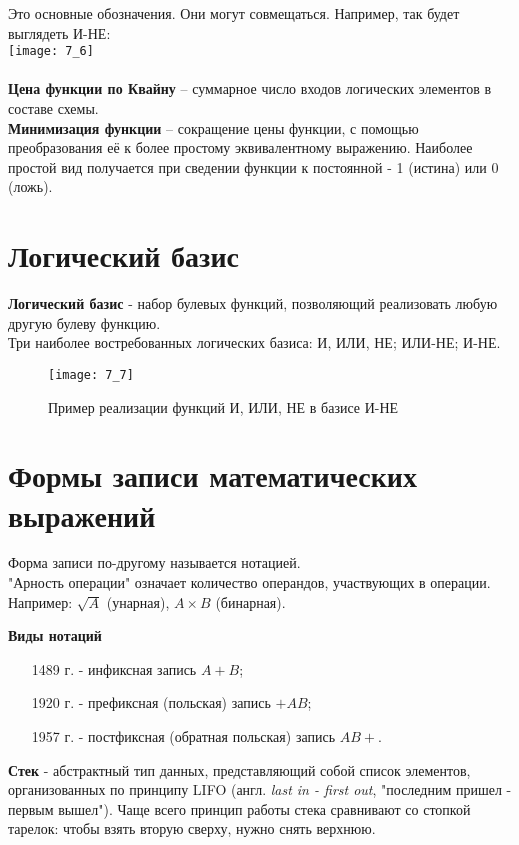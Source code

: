 Это основные обозначения. Они могут совмещаться. Например, так будет выглядеть И-НЕ:
\\\texttt{[image: 7\_6]}
\\
\\\textbf{Цена функции по Квайну} – суммарное число входов логических элементов в составе схемы.
\\\textbf{Минимизация функции} – сокращение цены функции, с помощью преобразования её к более простому эквивалентному выражению.
Наиболее простой вид получается при сведении функции к постоянной - 1 (истина) или 0 (ложь).
\section{Логический базис}
\textbf{Логический базис} - набор булевых функций, позволяющий реализовать любую другую булеву функцию.
\\Три наиболее востребованных логических базиса: И, ИЛИ, НЕ; ИЛИ-НЕ; И-НЕ.
\begin{figure}[!h]
\centering
\texttt{[image: 7\_7]}
\caption{Пример реализации функций И, ИЛИ, НЕ в базисе И-НЕ}
\end{figure}
\section{Формы записи математических выражений}
Форма записи по-другому называется нотацией.
\\"Арность операции" означает количество операндов, участвующих в операции.
\\Например: $\sqrt{A}$ (унарная), $A\times B$ (бинарная).
\\
\begin{center}
 \textbf{Виды нотаций}
\end{center}
\begin{itemize}
  \item[1489 г.] - инфиксная запись $A + B$;
  \item[1920 г.] - префиксная (польская) запись $+AB$;
  \item[1957 г.] - постфиксная (обратная польская) запись $AB+$.
\end{itemize}
\textbf{Стек} - абстрактный тип данных, представляющий собой список элементов, организованных по принципу LIFO (англ. \emph{last in - first out}, "последним пришел - первым вышел"). Чаще всего принцип работы стека сравнивают со стопкой тарелок: чтобы взять вторую сверху, нужно снять верхнюю.
